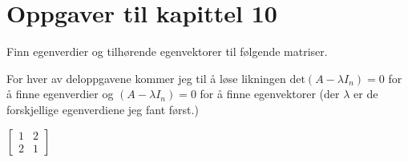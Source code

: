 \documentclass[11pt, a4paper, norsk]{NTNUoving}
\begin{document}
\section*{Oppgaver til kapittel 10}
    
    \begin{oppgave}
        Finn egenverdier og tilhørende egenvektorer til følgende matriser.
        
        For hver av deloppgavene kommer jeg til å løse likningen $\text{det}(A - \lambda I_{n}) = 0$ for å finne egenverdier og $(A-\lambda I_{n}) = 0$ for å finne egenvektorer (der $\lambda$ er de forskjellige egenverdiene jeg fant først.)

        \begin{punkt}
            $\begin{bmatrix}
                1 & 2 \\
                2 & 1
            \end{bmatrix}$


\end{punkt}
\end{oppgave}
\end{document}
